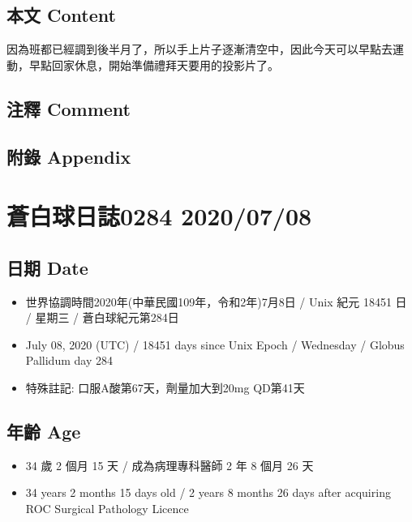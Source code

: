 \documentclass[
]{article}
\providecommand{\tightlist}{%
  \setlength{\itemsep}{0pt}\setlength{\parskip}{0pt}}
\begin{document}
\hypertarget{ux672cux6587-content-6}{%
\subsection{本文 Content}\label{ux672cux6587-content-6}}

因為班都已經調到後半月了，所以手上片子逐漸清空中，因此今天可以早點去運動，早點回家休息，開始準備禮拜天要用的投影片了。

\hypertarget{ux6ce8ux91cb-comment-6}{%
\subsection{注釋 Comment}\label{ux6ce8ux91cb-comment-6}}

\hypertarget{ux9644ux9304-appendix-6}{%
\subsection{附錄 Appendix}\label{ux9644ux9304-appendix-6}}

\hypertarget{ux84bcux767dux7403ux65e5ux8a8c0284-20200708}{%
\section{蒼白球日誌0284
2020/07/08}\label{ux84bcux767dux7403ux65e5ux8a8c0284-20200708}}

\hypertarget{ux65e5ux671f-date-7}{%
\subsection{日期 Date}\label{ux65e5ux671f-date-7}}

\begin{itemize}
\tightlist
\item
  世界協調時間2020年(中華民國109年，令和2年)7月8日 / Unix 紀元 18451 日
  / 星期三 / 蒼白球紀元第284日
\item
  July 08, 2020 (UTC) / 18451 days since Unix Epoch / Wednesday / Globus
  Pallidum day 284
\item
  特殊註記: 口服A酸第67天，劑量加大到20mg QD第41天
\end{itemize}

\hypertarget{ux5e74ux9f61-age-7}{%
\subsection{年齡 Age}\label{ux5e74ux9f61-age-7}}

\begin{itemize}
\tightlist
\item
  34 歲 2 個月 15 天 / 成為病理專科醫師 2 年 8 個月 26 天
\item
  34 years 2 months 15 days old / 2 years 8 months 26 days after
  acquiring ROC Surgical Pathology Licence
\end{itemize}
\end{document}
